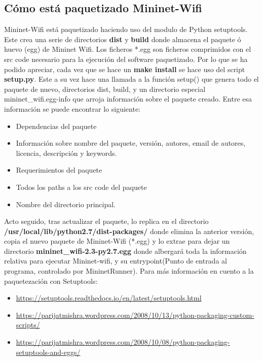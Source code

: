 \subsection{Cómo está paquetizado Mininet-Wifi}
Mininet-Wifi está paquetizado haciendo uso del modulo de Python setuptools. Este crea una serie de directorios \textbf{dist} y \textbf{build} donde almacena el paquete ó huevo (egg) de Mininet Wifi. Los ficheros *.egg son ficheros comprimidos con el src code necesario para la ejecución del software paquetizado.\newline
\newline 
Por lo que se ha podido apreciar, cada vez que se hace un \textbf{make install} se hace uso del script \textbf{setup.py}. Este a su vez hace una llamada a la función setup() que genera todo el paquete de nuevo, directorios dist, build, y un directorio especial mininet\_wifi.egg-info que arroja información sobre el paquete creado. Entre esa información se puede encontrar lo siguiente:
\begin{itemize}
    \item Dependencias del paquete
    \item Información sobre nombre del paquete, versión, autores, email de autores, licencia, descripción y keywords.
    \item Requerimientos del paquete
    \item Todos los paths a los src code del paquete
    \item Nombre del directorio principal.
\end{itemize}
Acto seguido, tras actualizar el paquete, lo replica en el directorio \textbf{/usr/local/lib/python2.7/dist-packages/} donde elimina la anterior versión, copia el nuevo paquete de Mininet-Wifi (*.egg) y lo extrae para dejar un directorio \textbf{mininet\_wifi-2.3-py2.7.egg} donde albergará toda la información relativa para ejecutar Mininet-wifi, y su entrypoint(Punto de entrada al programa, controlado por MininetRunner). \newline
\newline
Para más información en cuento a la paquetezación con Setuptools:
\begin{itemize}
    \item \url{https://setuptools.readthedocs.io/en/latest/setuptools.html}
    \item \url{https://parijatmishra.wordpress.com/2008/10/13/python-packaging-custom-scripts/}
    \item \url{https://parijatmishra.wordpress.com/2008/10/08/python-packaging-setuptools-and-eggs/}
\end{itemize}
\newpage
